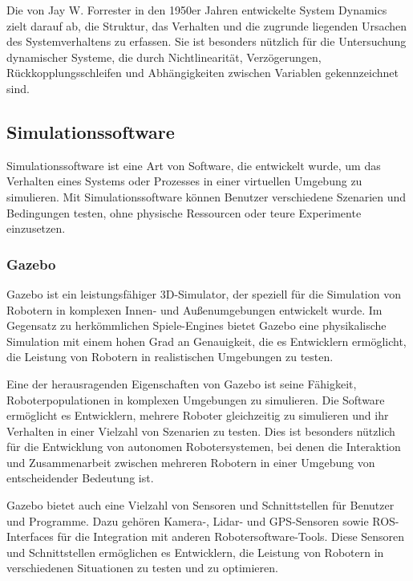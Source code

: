 \begin{description}
    Die von Jay W. Forrester in den 1950er Jahren entwickelte System Dynamics zielt darauf ab, die Struktur, das Verhalten und die zugrunde liegenden Ursachen des Systemverhaltens zu erfassen. Sie ist besonders nützlich für die Untersuchung dynamischer Systeme, die durch Nichtlinearität, Verzögerungen, Rückkopplungsschleifen und Abhängigkeiten zwischen Variablen gekennzeichnet sind.
    \cite[vgl.][]{system-dynamics}

\end{description}

\subsection{Simulationssoftware}
Simulationssoftware ist eine Art von Software, die entwickelt wurde, um das Verhalten eines Systems oder Prozesses in einer virtuellen Umgebung zu simulieren. Mit Simulationssoftware können Benutzer verschiedene Szenarien und Bedingungen testen, ohne physische Ressourcen oder teure Experimente einzusetzen.

\subsubsection{Gazebo}
Gazebo ist ein leistungsfähiger 3D-Simulator, der speziell für die Simulation von Robotern in komplexen Innen- und Außenumgebungen entwickelt wurde. Im Gegensatz zu herkömmlichen Spiele-Engines bietet Gazebo eine physikalische Simulation mit einem hohen Grad an Genauigkeit, die es Entwicklern ermöglicht, die Leistung von Robotern in realistischen Umgebungen zu testen.

Eine der herausragenden Eigenschaften von Gazebo ist seine Fähigkeit, Roboterpopulationen in komplexen Umgebungen zu simulieren. Die Software ermöglicht es Entwicklern, mehrere Roboter gleichzeitig zu simulieren und ihr Verhalten in einer Vielzahl von Szenarien zu testen. Dies ist besonders nützlich für die Entwicklung von autonomen Robotersystemen, bei denen die Interaktion und Zusammenarbeit zwischen mehreren Robotern in einer Umgebung von entscheidender Bedeutung ist.

Gazebo bietet auch eine Vielzahl von Sensoren und Schnittstellen für Benutzer und Programme. Dazu gehören Kamera-, Lidar- und GPS-Sensoren sowie ROS-Interfaces für die Integration mit anderen Robotersoftware-Tools. Diese Sensoren und Schnittstellen ermöglichen es Entwicklern, die Leistung von Robotern in verschiedenen Situationen zu testen und zu optimieren.
\cite[vgl.][]{gazebosim}

